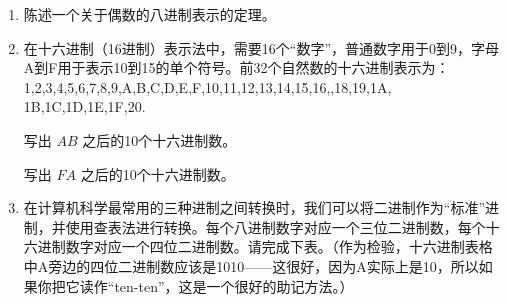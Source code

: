 \begin{enumerate}
{ 
  
  在每个阶段写出形如 $n = qd+r$ 的式子会很有帮助。前两个阶段应该看起来像这样
  \[ 3267 \; = \; 466 \cdot 7 + 5 \]
  \[ 466 \; = \; 66 \cdot 7 + 4 \]
  剩下的你来完成……
  }
  
  \item 
  
  陈述一个关于偶数的八进制表示的定理。
  \wbvfill
  
  
  \item 
    
    在十六进制（16进制）表示法中，需要16个“数字”，普通数字用于0到9，字母A到F用于表示10到15的单个符号。前32个自然数的十六进制表示为：
    1,2,3,4,5,6,7,8,9,A,B,C,D,E,F,10,11,12,13,14,15,16,,18,19,1A,
    1B,1C,1D,1E,1F,20.
  
    
    
    写出 $AB$ 之后的10个十六进制数。
  
    
    
    写出 $FA$ 之后的10个十六进制数。
    
  
  \wbvfill
  
  \workbookpagebreak
  
  \item 
  
  在计算机科学最常用的三种进制之间转换时，我们可以将二进制作为“标准”进制，并使用查表法进行转换。每个八进制数字对应一个三位二进制数，每个十六进制数字对应一个四位二进制数。请完成下表。（作为检验，十六进制表格中A旁边的四位二进制数应该是1010——这很好，因为A实际上是10，所以如果你把它读作“ten-ten”，这是一个很好的助记方法。）
  

\end{enumerate}
